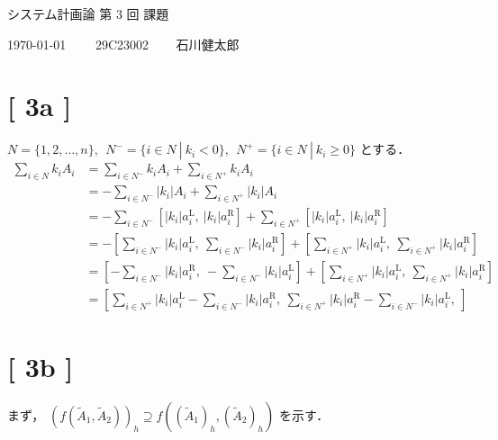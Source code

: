 \documentclass[uplatex, a4j, 10pt, fleqn, dvipdfmx]{article}
\begin{document}
\begin{center}
	{\Huge システム計画論 第 3 回 課題}
\end{center}

\begin{flushright}
	{\Large \today ~~~~ 29C23002 ~~~ 石川健太郎}
\end{flushright}

\section*{[ 3a ]}

\noindent
$N = \{ 1, 2, \dots, n \}, ~~ N^- = \{ i \in N ~ | ~ k_i < 0 \}, ~~ N^+ = \{ i \in N ~ | ~ k_i \geq 0 \}$ とする．
\begin{align}
	\sum_{i \in N} k_i A_i
	 & = \sum_{i \in N^-} k_i A_i + \sum_{i \in N^+} k_i A_i
	\\
	 & = - \sum_{i \in N^-} \left| k_i \right| A_i + \sum_{i \in N^+} \left| k_i \right| A_i
	\\
	 & = - \sum_{i \in N^-} \left[ \left| k_i \right| a_i^\text{L}, ~ \left| k_i \right| a_i^\text{R} \right] +
	\sum_{i \in N^+} \left[ \left| k_i \right| a_i^\text{L}, ~ \left| k_i \right| a_i^\text{R} \right]
	\\
	 & = - \left[
		\sum_{i \in N^-} \left| k_i \right| a_i^\text{L}, ~ \sum_{i \in N^-} \left| k_i \right| a_i^\text{R}
		\right] + \left[
		\sum_{i \in N^+} \left| k_i \right| a_i^\text{L}, ~ \sum_{i \in N^+} \left| k_i \right| a_i^\text{R}
		\right]
	\\
	 & = \left[
		- \sum_{i \in N^-} \left| k_i \right| a_i^\text{R}, ~ - \sum_{i \in N^-} \left| k_i \right| a_i^\text{L}
		\right] + \left[
		\sum_{i \in N^+} \left| k_i \right| a_i^\text{L}, ~ \sum_{i \in N^+} \left| k_i \right| a_i^\text{R}
		\right]
	\\
	 & = \left[
		\sum_{i \in N^+} \left| k_i \right| a_i^\text{L} - \sum_{i \in N^-} \left| k_i \right| a_i^\text{R}, ~
		\sum_{i \in N^+} \left| k_i \right| a_i^\text{R} - \sum_{i \in N^-} \left| k_i \right| a_i^\text{L}, ~
		\right]
\end{align}

\section*{[ 3b ]}

\noindent
まず， $\left( f \left( \tilde{A}_1, \tilde{A}_2 \right) \right)_h \supseteq
	f \left( ( \tilde{A}_1 )_h, ( \tilde{A}_2 )_h \right)$ を示す．
\end{document}
